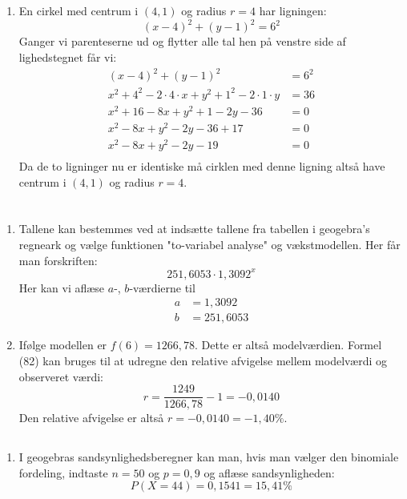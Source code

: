 \documentclass[10pt,a4paper,table]{article}
\begin{document}
\subsection{}
\begin{enumerate}
  \item En cirkel med centrum i $(4,1)$ og radius $r=4$ har ligningen:
    $$(x-4)^2+(y-1)^2=6^2$$
    Ganger vi parenteserne ud og flytter alle tal hen på venstre side af lighedstegnet får vi:
    \begin{align*}
      (x-4)^2+(y-1)^2&=6^2\\
      x^2+4^2-2\cdot4\cdot x+y^2+1^2-2\cdot 1\cdot y&=36\\
      x^2+16-8x+y^2+1-2y-36&=0\\
      x^2-8x+y^2-2y-36+17&=0\\
      x^2-8x+y^2-2y-19&=0\\
    \end{align*}
    Da de to ligninger nu er identiske må cirklen med denne ligning altså have centrum i $(4,1)$ og radius $r=4$.
\end{enumerate}

\section{}
\subsection{}
\begin{enumerate}
  \item Tallene kan bestemmes ved at indsætte tallene fra tabellen i geogebra's regneark og vælge funktionen "to-variabel analyse" og vækstmodellen. Her får man forskriften:
    $$251{,}6053\cdot 1{,}3092^x$$
    Her kan vi aflæse $a$-, $b$-værdierne til  
        \begin{align*}
          a&=1{,}3092\\
          b&=251{,}6053
        \end{align*}
      \item Ifølge modellen er $f(6)=1266{,}78$. Dette er altså modelværdien. Formel (82) kan bruges til at udregne den relative afvigelse mellem modelværdi og observeret værdi:
        $$r=\frac{1249}{1266{,}78}-1=-0{,}0140$$ 
      Den relative afvigelse er altså $r=-0{,}0140=-1{,}40\%$.
\end{enumerate}

\subsection{}
\begin{enumerate}
  \item I geogebras sandsynlighedsberegner kan man, hvis man vælger den binomiale fordeling, indtaste $n=50$ og $p=0{,}9$ og aflæse sandsynligheden:
    $$P(X=44)=0{,}1541=15{,}41\%$$
\end{enumerate}
\end{document}
